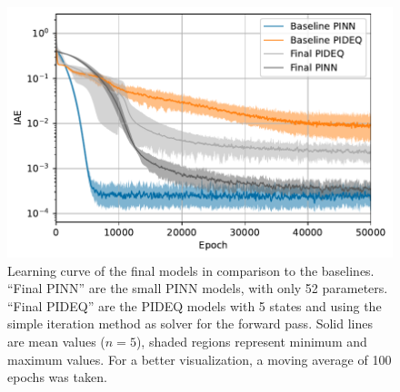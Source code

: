 \begin{figure}[h]
    \centering
    \includegraphics{images/final_iae.pdf}
    \caption{Learning curve of the final models in comparison to the baselines. ``Final PINN'' are the small \gls{PINN} models, with only 52 parameters. ``Final PIDEQ'' are the \gls{PIDEQ} models with 5 states and using the simple iteration method as solver for the forward pass. Solid lines are mean values ($n=5$), shaded regions represent minimum and maximum values. For a better visualization, a moving average of 100 epochs was taken.}
    \label{fig:final-iae}
\end{figure}


